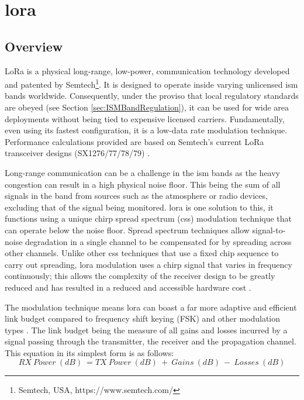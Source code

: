 \section{\ac{lora}}
\subsection{Overview}
LoRa is a physical long-range, low-power, communication technology developed and patented by Semtech\footnote{Semtech, USA, https://www.semtech.com/}. It is designed to operate inside varying unlicensed \ac{ism} bands worldwide. Consequently, under the proviso that local regulatory standards are obeyed (see Section \ref{sec:ISMBandRegulation}), it can be used for wide area deployments without being tied to expensive licensed carriers. Fundamentally, even using its fastest configuration, it is a low-data rate modulation technique. Performance calculations provided are based on Semtech's current LoRa transceiver designs (SX1276/77/78/79) \cite{3YP:LORA_SX12}.

Long-range communication can be a challenge in the \ac{ism} bands as the heavy congestion can result in a high physical noise floor. This being the sum of all signals in the band from sources such as the atmosphere or radio devices, excluding that of the signal being monitored. \ac{lora} is one solution to this, it functions using a unique chirp spread spectrum (\ac{css}) modulation technique that can operate below the noise floor. Spread spectrum techniques allow signal-to-noise degradation in a single channel to be compensated for by spreading across other channels. Unlike other \ac{css} techniques that use a fixed chip sequence to carry out spreading, \ac{lora} modulation uses a chirp signal that varies in frequency continuously; this allows the complexity of the receiver design to be greatly reduced and has resulted in a reduced and accessible hardware cost \cite{3YP:LORA_MOD_BASICS}.

The modulation technique means \ac{lora} can boast a far more adaptive and efficient link budget compared to frequency shift keying (FSK) and other modulation types \cite{3YP:LORA_MOD_BASICS}. The link budget being the measure of all gains and losses incurred by a signal passing through the transmitter, the receiver and the propagation channel. This equation in its simplest form is as follows:
\begin{equation}
\label{link_budget}
RX\ Power\ (dB)\ = TX\ Power\ (dB)\ +\ Gains\ (dB)\ -\ Losses\ (dB)
\end{equation}

